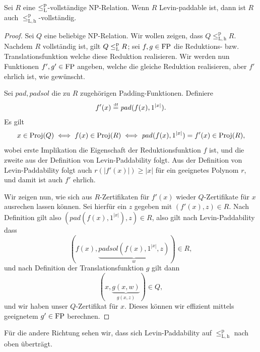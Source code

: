 \begin{lemma}
    Sei $R$ eine $\leq_\mathrm{L}^\mathrm{p}$-vollständige NP-Relation. Wenn $R$ Levin-paddable ist, dann ist 
    $R$ auch $\leq_\mathrm{L,h}^\mathrm p$-vollständig.
\end{lemma}
\begin{proof}
    Sei $Q$ eine beliebige NP-Relation. Wir wollen zeigen, dass $Q\leq_\mathrm{L,h}^\mathrm p R$.
    Nachdem $R$ vollständig ist, gilt $Q\leq_\mathrm{L}^\mathrm{p} R$; sei $f,g\in\mathrm{FP}$ die Reduktions- bzw. Translationsfunktion welche diese Reduktion realisieren. Wir werden nun Funktionen $f', g'\in\mathrm{FP}$ angeben, welche die gleiche Reduktion realisieren, aber $f'$ ehrlich ist, wie gewünscht.

    Sei $\mathit{pad}, \mathit{padsol}$ die zu $R$ zugehörigen Padding-Funktionen. Definiere
    \[ f'(x) \stackrel{\text{{\normalfont\tiny df}}}{=}  \mathit{pad}(f(x), 1^{|x|}). \]
    Es gilt
    \[ x\in\operatorname{Proj}(Q) \iff f(x)\in \operatorname{Proj}(R) \iff \mathit{pad}(f(x), 1^{|x|})=f'(x)\in\operatorname{Proj}(R), \]
    wobei erste Implikation die Eigenschaft der Reduktionsfunktion $f$ ist, und die zweite aus der Definition von Levin-Paddability folgt.
    Aus der Definition von  Levin-Paddability folgt auch $r(|f'(x)|)\geq |x|$ für ein geeignetes Polynom $r$, und damit ist auch $f'$ ehrlich.

    Wir zeigen nun, wie sich aus $R$-Zertifikaten für $f'(x)$ wieder $Q$-Zertifikate für $x$ ausrechen lassen können.
    Sei hierfür ein $z$ gegeben mit $(f'(x), z)\in R$.
    Nach Definition gilt also $(\mathit{pad}(f(x), 1^{|x|}), z)\in R$, also gilt nach Levin-Paddability dass \[(f(x), \underbrace{\mathit{padsol}(f(x), 1^{|x|}, z)}_w)\in R,\] 
    und nach Definition der Translationsfunktion $g$ gilt dann
    \[(x, \underbrace{g(x, w)}_{g(x,z)})\in Q,\]
    und wir haben unser $Q$-Zertifikat für $x$. Dieses können wir effizient mittels geeignetem $g'\in\mathrm{FP}$ berechnen.
\end{proof}

Für die andere Richtung sehen wir, dass sich Levin-Paddability auf $\leq_\mathrm{L,h}^\mathrm p$ nach oben überträgt. 

